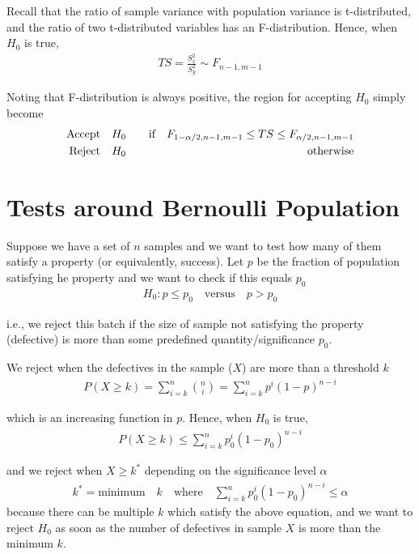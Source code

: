 \documentclass[../probability-notes.tex]{subfiles}
\begin{document}
    Recall that the ratio of sample variance with population variance is t-distributed, and the ratio of two t-distributed variables has an F-distribution. Hence, when $H_{0}$ is true,
    \begin{align*}
        TS = \frac{S_{x}^{2}}{S_{y}^{2}} \sim F_{n-1, m-1}
    \end{align*}

    Noting that F-distribution is always positive, the region for accepting $H_{0}$ simply become
    \begin{alignat*}{2}
        \text{Accept\quad} &H_{0} &\text{\quad if} \quad F_{1-\alpha/2, n-1, m-1} \leq TS \leq F_{\alpha/2, n-1, m-1}\\
        \text{Reject\quad} &H_{0} &\text{\quad otherwise}
    \end{alignat*}

    \section{Tests around Bernoulli Population}
    Suppose we have a set of $n$ samples and we want to test how many of them satisfy a property (or equivalently, success). Let $p$ be the fraction of population satisfying he property and we want to check if this equals $p_{0}$
    \begin{align*}
        H_{0}: p \leq p_{0} \quad \text{versus} \quad p > p_{0}
    \end{align*}

    i.e., we reject this batch if the size of sample not satisfying the property (defective) is more than some predefined quantity/significance $p_{0}$.\newline

    We reject when the defectives in the sample ($X$) are more than a threshold $k$
    \begin{align*}
        P(X \geq k) = \sum_{i=k}^{n} \binom{n}{i} = \sum_{i=k}^{n} p^{i}(1-p)^{n-i}
    \end{align*}

    which is an increasing function in $p$. Hence, when $H_{0}$ is true,
    \begin{align*}
        P(X \geq k) \leq \sum_{i=k}^{n} p_{0}^{i}(1-p_{0})^{n-i}
    \end{align*}

    and we reject when $X \geq k^{*}$ depending on the significance level $\alpha$
    \begin{align*}
        k^{*} = \text{minimum}\quad k \quad \text{where} \quad \sum_{i=k}^{n} p_{0}^{i}(1-p_{0})^{n-i} \leq \alpha
    \end{align*}
    because there can be multiple $k$ which satisfy the above equation, and we want to reject $H_{0}$ as soon as the number of defectives in sample $X$ is more than the minimum $k$.\newline
\end{document}

